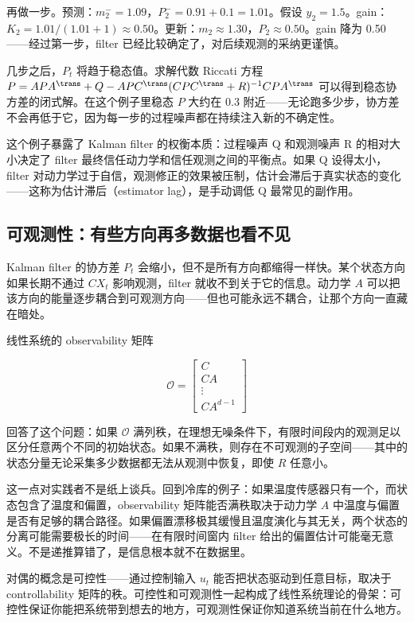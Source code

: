 再做一步。预测：\(m_2^- = 1.09\)，\(P_2^- = 0.91 + 0.1 = 1.01\)。假设 \(y_2 = 1.5\)。gain：\(K_2 = 1.01 / (1.01 + 1) \approx 0.50\)。更新：\(m_2 \approx 1.30\)，\(P_2 \approx 0.50\)。gain 降为 0.50——经过第一步，filter 已经比较确定了，对后续观测的采纳更谨慎。

几步之后，\(P_t\) 将趋于稳态值。求解代数 Riccati 方程 \(P = A P A^{\trans} + Q - A P C^{\trans}(C P C^{\trans} + R)^{-1} C P A^{\trans}\) 可以得到稳态协方差的闭式解。在这个例子里稳态 \(P\) 大约在 0.3 附近——无论跑多少步，协方差不会再低于它，因为每一步的过程噪声都在持续注入新的不确定性。

这个例子暴露了 Kalman filter 的权衡本质：过程噪声 Q 和观测噪声 R 的相对大小决定了 filter 最终信任动力学和信任观测之间的平衡点。如果 Q 设得太小，filter 对动力学过于自信，观测修正的效果被压制，估计会滞后于真实状态的变化——这称为估计滞后（estimator lag），是手动调低 Q 最常见的副作用。

\subsection{可观测性：有些方向再多数据也看不见}

Kalman filter 的协方差 \(P_t\) 会缩小，但不是所有方向都缩得一样快。某个状态方向如果长期不通过 \(C X_t\) 影响观测，filter 就收不到关于它的信息。动力学 \(A\) 可以把该方向的能量逐步耦合到可观测方向——但也可能永远不耦合，让那个方向一直藏在暗处。

线性系统的 observability 矩阵

\[
\mathcal{O} =
\begin{bmatrix}
C \\ CA \\ \vdots \\ CA^{d-1}
\end{bmatrix}
\]

回答了这个问题：如果 \(\mathcal{O}\) 满列秩，在理想无噪条件下，有限时间段内的观测足以区分任意两个不同的初始状态。如果不满秩，则存在不可观测的子空间——其中的状态分量无论采集多少数据都无法从观测中恢复，即使 \(R\) 任意小。

这一点对实践者不是纸上谈兵。回到冷库的例子：如果温度传感器只有一个，而状态包含了温度和偏置，observability 矩阵能否满秩取决于动力学 \(A\) 中温度与偏置是否有足够的耦合路径。如果偏置漂移极其缓慢且温度演化与其无关，两个状态的分离可能需要极长的时间——在有限时间窗内 filter 给出的偏置估计可能毫无意义。不是递推算错了，是信息根本就不在数据里。

对偶的概念是可控性——通过控制输入 \(u_t\) 能否把状态驱动到任意目标，取决于 controllability 矩阵的秩。可控性和可观测性一起构成了线性系统理论的骨架：可控性保证你能把系统带到想去的地方，可观测性保证你知道系统当前在什么地方。

